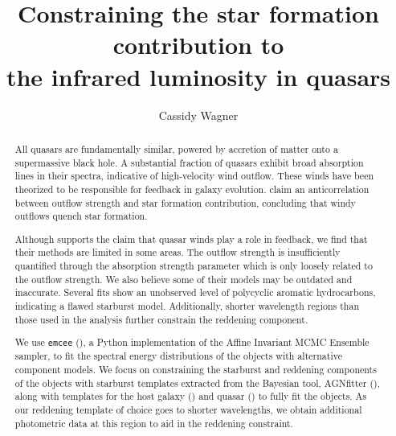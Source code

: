 
\usepackage{graphicx}
\usepackage{amsmath}
\usepackage{courier}





\title{Constraining the star formation contribution to \\ 
       the infrared luminosity in quasars}


\author{Cassidy Wagner}

\begin{abstract}

All quasars are fundamentally similar, powered by accretion of matter onto a supermassive black hole. A substantial fraction 
of quasars exhibit broad absorption lines in their spectra, indicative of high-velocity wind outflow. These winds have been 
theorized to be responsible for feedback in galaxy evolution. \cite{farrah2012} claim an anticorrelation between 
outflow strength and star formation contribution, concluding that windy outflows quench star formation.

Although \cite{farrah2012} supports the claim that quasar winds play a role in feedback, we find that their methods are limited 
in some areas. The outflow strength is insufficiently quantified through the absorption strength parameter which is 
only loosely related to the outflow strength. We also believe some of their models may be outdated and inaccurate. Several 
fits show an unobserved level of polycyclic aromatic hydrocarbons, indicating a flawed starburst model. Additionally, shorter 
wavelength regions than those used in the \cite{farrah2012} analysis further constrain the reddening component.

We use \texttt{emcee} (\citealp{foremanmackey2013}), a Python implementation of the Affine Invariant MCMC Ensemble sampler, to fit the 
spectral energy distributions of the \cite{farrah2012} objects with alternative component models. We focus on constraining 
the starburst and reddening components of the objects with starburst templates extracted from the Bayesian tool, AGNfitter 
(\citealp{rivera2016}), along with 
templates for the host galaxy (\citealp{fioc1997}) and quasar (\citealp{lyu2017feb}) to fully fit the objects. As our 
reddening template of choice goes to shorter wavelengths, 
we obtain additional photometric data at this region to aid in the reddening constraint.  

\end{abstract}


